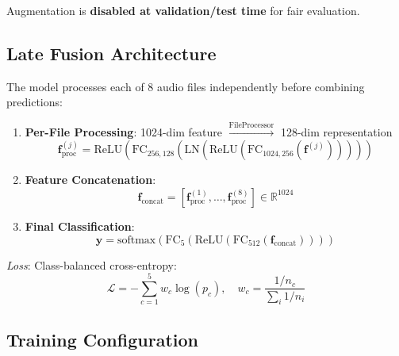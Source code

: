 \documentclass[conference]{IEEEtran}
\begin{document}
Augmentation is \textbf{disabled at validation/test time} for fair evaluation.

\subsection{Late Fusion Architecture}

The model processes each of 8 audio files independently before combining predictions:

\begin{enumerate}
  \item \textbf{Per-File Processing}: 1024-dim feature $\xrightarrow{\text{FileProcessor}}$ 128-dim representation
    \begin{equation}
      \mathbf{f}^{(j)}_{\text{proc}} = \text{ReLU}(\text{FC}_{256,128}(\text{LN}(\text{ReLU}(\text{FC}_{1024,256}(\mathbf{f}^{(j)})))))
    \end{equation}
    
  \item \textbf{Feature Concatenation}: 
    \begin{equation}
      \mathbf{f}_{\text{concat}} = [\mathbf{f}^{(1)}_{\text{proc}}, \ldots, \mathbf{f}^{(8)}_{\text{proc}}] \in \mathbb{R}^{1024}
    \end{equation}
    
  \item \textbf{Final Classification}: 
    \begin{equation}
      \mathbf{y} = \text{softmax}(\text{FC}_{5}(\text{ReLU}(\text{FC}_{512}(\mathbf{f}_{\text{concat}}))))
    \end{equation}
\end{enumerate}

\textit{Loss}: Class-balanced cross-entropy:
\begin{equation}
  \mathcal{L} = -\sum_{c=1}^{5} w_c \log(p_c), \quad w_c = \frac{1/n_c}{\sum_i 1/n_i}
\end{equation}

\subsection{Training Configuration}
\end{document}
